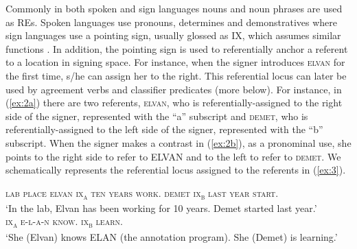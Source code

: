 \documentclass[review]{elsarticle} %
\begin{document}
Commonly in both spoken and sign languages nouns and noun phrases are
used as REs. Spoken languages use pronouns, determines and
demonstratives where sign languages use a pointing sign, usually glossed
as IX, which assumes similar functions \citep{lillo-martin1990}. In
addition, the pointing sign is used to referentially anchor a referent
to a location in signing space. For instance, when the signer introduces
\textsc{elvan} for the first time, s/he can assign her to the right.
This referential locus can later be used by agreement verbs and
classifier predicates (more below). For instance, in (\ref{ex:2a}) there
are two referents, \textsc{elvan}, who is referentially-assigned to the
right side of the signer, represented with the ``a'' subscript and
\textsc{demet}, who is referentially-assigned to the left side of the
signer, represented with the ``b'' subscript. When the signer makes a
contrast in (\ref{ex:2b}), as a pronominal use, she points to the right
side to refer to ELVAN and to the left to refer to \textsc{demet}. We
schematically represents the referential locus assigned to the referents
in (\ref{ex:3}).

\begin{exe}
    \ex 
\begin{xlist}
    \ex \label{ex:2a}
    \textsc{lab place elvan ix\textsubscript{a} ten years work. demet ix\textsubscript{b} last year start.} \\
    ‘In the lab, Elvan has been working for 10 years. Demet started last year.’
    \\
    \ex \label{ex:2b}
    \textsc{ix\textsubscript{a} e-l-a-n know. ix\textsubscript{b} learn.}\\
    ‘She (Elvan) knows ELAN (the annotation program). She (Demet) is learning.’
    \end{xlist}
    \end{exe}
\end{document}
